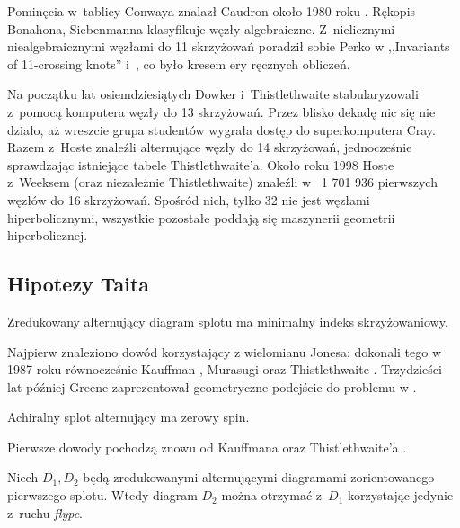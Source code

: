 Pominęcia w~tablicy Conwaya znalazł Caudron około 1980 roku \cite{caudron82}.
Rękopis \cite{bonahon80} Bonahona, Siebenmanna klasyfikuje węzły algebraiczne.
Z~nielicznymi niealgebraicznymi węzłami do 11 skrzyżowań poradził sobie Perko w ,,Invariants of 11-crossing knots'' i~\cite{perko82}, co było kresem ery ręcznych obliczeń.

Na początku lat osiemdziesiątych Dowker i~Thistlethwaite \cite{dowker83} stabularyzowali z~pomocą komputera węzły do 13 skrzyżowań.
Przez blisko dekadę nic się nie działo, aż wreszcie grupa studentów wygrała dostęp do superkomputera Cray.
Razem z~Hoste znaleźli alternujące węzły do 14 skrzyżowań, jednocześnie sprawdzając istniejące tabele Thistlethwaite'a.
Około roku 1998 Hoste z~Weeksem (oraz niezależnie Thistlethwaite) znaleźli w~\cite{thistlethwaite98} 1 701 936 pierwszych węzłów do 16 skrzyżowań.
Spośród nich, tylko 32 nie jest węzłami hiperbolicznymi, wszystkie pozostałe poddają się maszynerii geometrii hiperbolicznej.

\subsection{Hipotezy Taita}
\begin{conjecture}
    \label{conj_tait_i}
    Zredukowany alternujący diagram splotu ma minimalny indeks skrzyżowaniowy.
\end{conjecture}

Najpierw znaleziono dowód korzystający z wielomianu Jonesa: dokonali tego w 1987 roku równocześnie Kauffman \cite{kauffman87}, Murasugi \cite{murasugi87} oraz Thistlethwaite \cite{thistlethwaite87}.
Trzydzieści lat później Greene zaprezentował geometryczne podejście do problemu w \cite{greene17}.

\begin{conjecture}
    \label{conj_tait_ii}
    Achiralny splot alternujący ma zerowy spin.
\end{conjecture}

Pierwsze dowody pochodzą znowu od Kauffmana \cite{kauffman87} oraz Thistlethwaite'a \cite{thistlethwaite87}.

\begin{conjecture}
    \label{conj_tait_iii}
    Niech $D_1, D_2$ będą zredukowanymi alternującymi diagramami zorientowanego pierwszego splotu.
    Wtedy diagram $D_2$ można otrzymać z~$D_1$ korzystając jedynie z~ruchu \emph{flype}.
\end{conjecture}

